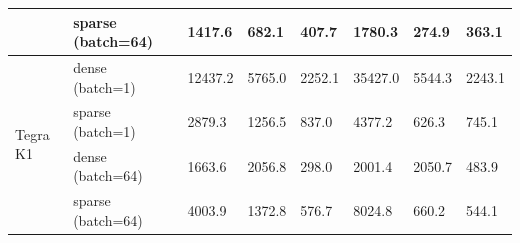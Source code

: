 \documentclass{article} %
\begin{document}
\begin{table}[h!]
\begin{tabular}{p{2.4cm}l|llllll}
                                                                           & sparse (batch=64) & 1417.6                                                & 682.1                                                 & 407.7                                                 & 1780.3                                              & 274.9                                               & 363.1                                               \\
\hline
\multirow{4}{*}{Tegra K1}                                                  & dense (batch=1)  & 12437.2                                               & 5765.0                                                & 2252.1                                                & 35427.0                                             & 5544.3                                              & 2243.1                                              \\
                                                                           & sparse (batch=1) & 2879.3                                                & 1256.5                                                & 837.0                                                 & 4377.2                                              & 626.3                                               & 745.1                                               \\
                                                                           & dense (batch=64)  & 1663.6                                                & 2056.8                                                & 298.0                                                 & 2001.4                                              & 2050.7                                              & 483.9                                               \\
                                                                           & sparse (batch=64) & 4003.9                                                & 1372.8                                                & 576.7                                                 & 8024.8                                              & 660.2                                               & 544.1   \\ 
                                            \hline
\end{tabular}
\end{table}
\end{document}
